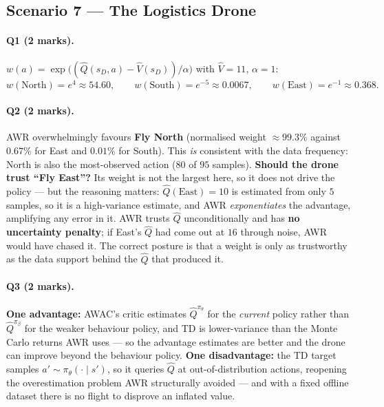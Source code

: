 \documentclass[11pt,a4paper]{article}
\begin{document}
\subsection{Scenario 7 --- The Logistics Drone}

\paragraph{Q1 (2 marks).} $w(a)=\exp\bigl((\hat Q(s_D,a)-\hat V(s_D))/\alpha\bigr)$
with $\hat V=11$, $\alpha=1$:
\[
w(\text{North})=e^{4}\approx \mathbf{54.60},\qquad
w(\text{South})=e^{-5}\approx \mathbf{0.0067},\qquad
w(\text{East})=e^{-1}\approx \mathbf{0.368}.
\]

\paragraph{Q2 (2 marks).} AWR overwhelmingly favours \textbf{Fly North}
(normalised weight $\approx 99.3\%$ against $0.67\%$ for East and $0.01\%$ for
South). This \emph{is} consistent with the data frequency: North is also the
most-observed action ($80$ of $95$ samples). \textbf{Should the drone trust
``Fly East''?} Its weight is not the largest here, so it does not drive the
policy --- but the reasoning matters: $\hat Q(\text{East})=10$ is estimated
from only $5$ samples, so it is a high-variance estimate, and AWR
\emph{exponentiates} the advantage, amplifying any error in it. AWR trusts
$\hat Q$ unconditionally and has \textbf{no uncertainty penalty}; if East's
$\hat Q$ had come out at $16$ through noise, AWR would have chased it. The
correct posture is that a weight is only as trustworthy as the data support
behind the $\hat Q$ that produced it.

\paragraph{Q3 (2 marks).} \textbf{One advantage:} AWAC's critic estimates
$\hat Q^{\pi_\theta}$ for the \emph{current} policy rather than
$\hat Q^{\pi_\beta}$ for the weaker behaviour policy, and TD is lower-variance
than the Monte Carlo returns AWR uses --- so the advantage estimates are
better and the drone can improve beyond the behaviour policy.
\textbf{One disadvantage:} the TD target samples $a'\sim\pi_\theta(\cdot\mid s')$,
so it queries $\hat Q$ at out-of-distribution actions, reopening the
overestimation problem AWR structurally avoided --- and with a fixed offline
dataset there is no flight to disprove an inflated value.
\end{document}
